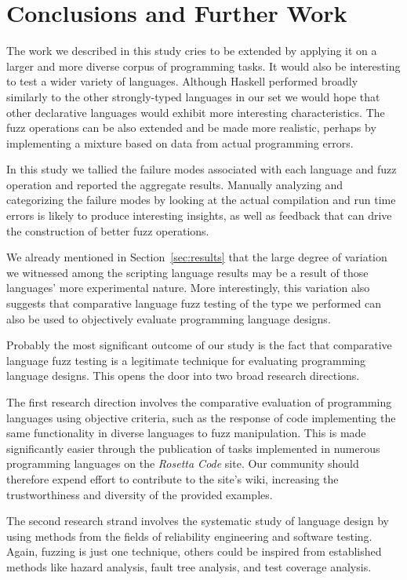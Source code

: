 \documentclass[10pt]{sigplanconf}
\begin{document}
\section{Conclusions and Further Work} %
\label{sec:conclusions}

The work we described in this study cries to be extended
by applying it on a larger and more diverse corpus of programming tasks.
It would also be interesting to test a wider variety of languages.
Although Haskell performed broadly similarly to the other strongly-typed
languages in our set we would hope that other declarative languages
would exhibit more interesting characteristics.
The fuzz operations can be also extended and be made more realistic,
perhaps by implementing a mixture based on data from actual programming
errors.

In this study we tallied the failure modes associated with each
language and fuzz operation and reported the aggregate results.
Manually analyzing and categorizing the failure modes by looking
at the actual compilation and run time errors
is likely to produce interesting insights,
as well as feedback that can drive the
construction of better fuzz operations.

We already mentioned in Section~\ref{sec:results} that the
large degree of variation we witnessed among the scripting
language results may be a result of those languages'
more experimental nature.
More interestingly, this variation also suggests that
comparative language fuzz testing of the type we performed
can also be used to objectively evaluate programming language
designs.

Probably the most significant outcome of our study is the
fact that comparative language fuzz testing is a
legitimate technique for evaluating programming language designs.
This opens the door into two broad research directions.

The first research direction involves the comparative evaluation
of programming languages using objective criteria,
such as the response of code implementing the same functionality
in diverse languages to fuzz manipulation.
This is made significantly easier through the publication of
tasks implemented in numerous programming languages on the
{\em Rosetta Code} site.
Our community should therefore expend effort to contribute to
the site's wiki, increasing the trustworthiness and diversity of
the provided examples.

The second research strand involves the systematic study of
language design by using methods from the fields of reliability engineering
and software testing.
Again, fuzzing is just one technique, others could be inspired from
established methods like
hazard analysis,
fault tree analysis, and
test coverage analysis.
\end{document}

